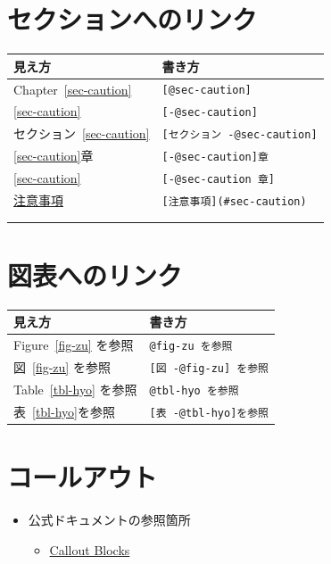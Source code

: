 \documentclass[
  b5paper,
  xelatex, ja=standard]{bxjsbook}
\providecommand{\tightlist}{%
  \setlength{\itemsep}{0pt}\setlength{\parskip}{0pt}}\usepackage{longtable,booktabs,array}
\begin{document}
\section{セクションへのリンク}\label{ux30bbux30afux30b7ux30e7ux30f3ux3078ux306eux30eaux30f3ux30af}

\begin{longtable}[]{@{}ll@{}}
\toprule\noalign{}
見え方 & 書き方 \\
\midrule\noalign{}
\endhead
\bottomrule\noalign{}
\endlastfoot
Chapter~\ref{sec-caution} & \texttt{{[}@sec-caution{]}} \\
\ref{sec-caution} & \texttt{{[}-@sec-caution{]}} \\
セクション~\ref{sec-caution} &
\texttt{{[}セクション\ -@sec-caution{]}} \\
\ref{sec-caution}章 & \texttt{{[}-@sec-caution{]}章} \\
\ref{sec-caution} & \texttt{{[}-@sec-caution\ 章{]}} \\
\hyperref[sec-caution]{注意事項} &
\texttt{{[}注意事項{]}(\#sec-caution)} \\
& \\
& \\
\end{longtable}

\section{図表へのリンク}\label{ux56f3ux8868ux3078ux306eux30eaux30f3ux30af}

\begin{longtable}[]{@{}ll@{}}
\toprule\noalign{}
見え方 & 書き方 \\
\midrule\noalign{}
\endhead
\bottomrule\noalign{}
\endlastfoot
Figure~\ref{fig-zu} を参照 & \texttt{@fig-zu\ を参照} \\
図~\ref{fig-zu} を参照 & \texttt{{[}図\ -@fig-zu{]}\ を参照} \\
Table~\ref{tbl-hyo} を参照 & \texttt{@tbl-hyo\ を参照} \\
表~\ref{tbl-hyo}を参照 & \texttt{{[}表\ -@tbl-hyo{]}を参照} \\
\end{longtable}

\section{コールアウト}\label{ux30b3ux30fcux30ebux30a2ux30a6ux30c8}

\begin{itemize}
\tightlist
\item
  公式ドキュメントの参照箇所

  \begin{itemize}
  \tightlist
  \item
    \href{https://quarto.org/docs/authoring/callouts.html}{Callout
    Blocks}
  \end{itemize}
\end{itemize}
\end{document}
